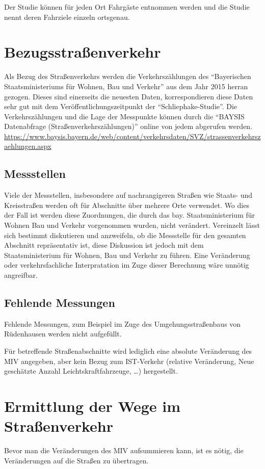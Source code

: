 \documentclass[fontsize=12pt,a4paper]{scrreprt}
\begin{document}
Der Studie können für jeden Ort Fahrgäste entnommen werden und die Studie nennt deren Fahrziele einzeln ortsgenau.

\section{Bezugsstraßenverkehr}
Als Bezug des Straßenverkehrs werden die Verkehrszählungen des \enquote{Bayerischen Staatsministeriums für Wohnen, Bau und Verkehr} aus dem Jahr 2015 herran gezogen. Dieses sind einerseits die neuesten Daten, korrespondieren diese Daten sehr gut mit dem Veröffentlichungszeitpunkt der \enquote{Schliephake-Studie}.
Die Verkehrszählungen und die Lage der Messpunkte können durch die \enquote{BAYSIS Datenabfrage (Straßenverkehrszählungen)} online von jedem abgerufen werden.
\url{https://www.baysis.bayern.de/web/content/verkehrsdaten/SVZ/strassenverkehrszaehlungen.aspx}

\subsection{Messstellen}
Viele der Messstellen, insbesondere auf nachrangigeren Straßen wie Staats- und Kreisstraßen werden oft für Abschnitte über mehrere Orte verwendet. Wo dies der Fall ist werden diese Zuordnungen, die durch das bay. Staatsministerium für Wohnen Bau und Verkehr vorgenommen wurden, nicht verändert. 
Vereinzelt lässt sich bestimmt diskutieren und anzweifeln, ob die Messstelle für den gesamten Abschnitt repräsentativ ist, diese Diskussion ist jedoch mit dem Staatsministerium für Wohnen, Bau und Verkehr zu führen. Eine Veränderung oder verkehrsfachliche Interpratation im Zuge dieser Berechnung wäre unnötig angreifbar.

\subsection{Fehlende Messungen}
Fehlende Messungen, zum Beispiel im Zuge des Umgehungsstraßenbaus von Rüdenhausen werden nicht aufgefüllt. 

Für betreffende Straßenabschnitte wird lediglich eine absolute Veränderung des MIV angegeben, aber kein Bezug zum IST-Verkehr (relative Veränderung, Neue geschätzte Anzahl Leichtskraftfahrzeuge, \ldots) hergestellt.
        \section{Ermittlung der Wege im Straßenverkehr}
Bevor man die Veränderungen des MIV aufsummieren kann, ist es nötig, die Veränderungen auf die Straßen zu übertragen.
\end{document}
